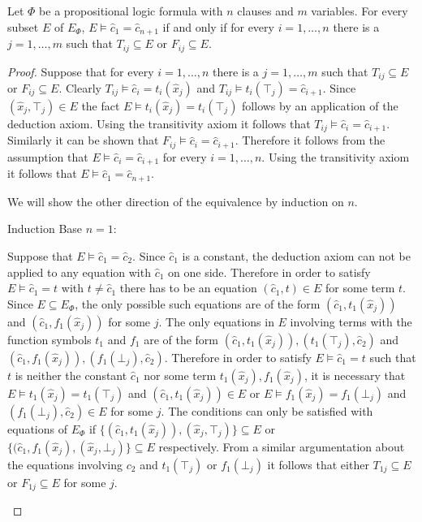 \begin{lemma}
\label{lemma:charexpl}

Let $\Phi$ be a propositional logic formula with $n$ clauses and $m$ variables.
For every subset $E$ of $E_{\Phi}$, $E \models \hat{c}_1 = \hat{c}_{n+1}$ if and only if for every $i = 1,\ldots,n$ there is a $j = 1,\ldots,m$ such that $T_{ij} \subseteq E$ or $F_{ij} \subseteq E$.

\end{lemma}

\begin{proof}

Suppose that for every $i = 1,\ldots,n$ there is a $j = 1,\ldots,m$ such that $T_{ij} \subseteq E$ or $F_{ij} \subseteq E$.
Clearly $T_{ij} \models \hat{c}_i = t_i(\hat{x}_j)$ and $T_{ij} \models t_i(\top_j) = \hat{c}_{i+1}$. 
Since $(\hat{x}_j,\top_j) \in E$ the fact $E \models t_i(\hat{x}_j) = t_i(\top_j)$ follows by an application of the deduction axiom.
Using the transitivity axiom it follows that $T_{ij} \models \hat{c}_i = \hat{c}_{i+1}$.
Similarly it can be shown that $F_{ij} \models \hat{c}_i = \hat{c}_{i+1}$.
Therefore it follows from the assumption that $E \models \hat{c}_i = \hat{c}_{i+1}$ for every $i = 1,\ldots,n$.
Using the transitivity axiom it follows that $E \models \hat{c}_1 = \hat{c}_{n+1}$.


\noindent We will show the other direction of the equivalence by induction on $n$.
\begin{paragraph}{Induction Base $n = 1$:}

Suppose that $E \models \hat{c}_1 = \hat{c}_{2}$. %
Since $\hat{c}_1$ is a constant, the deduction axiom can not be applied to any equation with $\hat{c}_1$ on one side.
Therefore in order to satisfy $E \models \hat{c}_1 = t$ with $t \neq \hat{c}_1$ there has to be an equation $(\hat{c}_1, t) \in E$ for some term $t$.
Since $E \subseteq E_{\Phi}$, the only possible such equations are of the form $(\hat{c}_1, t_1(\hat{x}_j))$ and $(\hat{c}_1, f_1(\hat{x}_j))$ for some $j$.
The only equations in $E$ involving terms with the function symbols $t_1$ and $f_1$ are of the form $(\hat{c}_1, t_1(\hat{x}_j)), (t_1(\top_j),\hat{c}_2)$ and $(\hat{c}_1, f_1(\hat{x}_j)), (f_1(\bot_j),\hat{c}_2)$.
Therefore in order to satisfy $E \models \hat{c}_1 = t$ such that $t$ is neither the constant $\hat{c}_1$ nor some term $t_1(\hat{x}_j), f_1(\hat{x}_j)$, it is necessary that $E \models t_1(\hat{x}_j) = t_1(\top_j)$ and $(\hat{c}_1, t_1(\hat{x}_j)) \in E$ or $E \models f_1(\hat{x}_j) = f_1(\bot_j)$ and $(f_1(\bot_j),\hat{c}_2) \in E$ for some $j$.
The conditions can only be satisfied with equations of $E_{\Phi}$ if $\{(\hat{c}_1, t_1(\hat{x}_j)), (\hat{x}_j,\top_j)\} \subseteq E$ or $\{(\hat{c}_1, f_1(\hat{x}_j), (\hat{x}_j,\bot_j)\} \subseteq E$ respectively.
From a similar argumentation about the equations involving $c_2$ and $t_1(\top_j)$ or $f_1(\bot_j)$ it follows that either $T_{1j} \subseteq E$ or $F_{1j} \subseteq E$ for some $j$.
\end{paragraph}


\end{proof}
